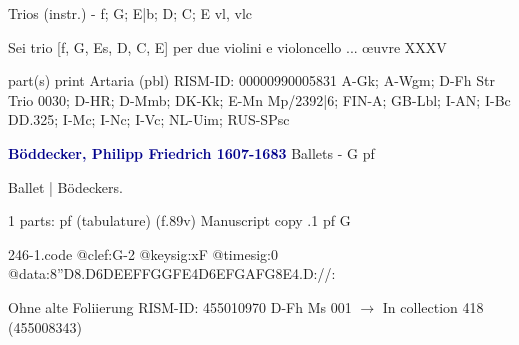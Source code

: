 \documentclass[twocolumn]{book}
\begin{document}
\newline Trios (instr.) - f; G; E|b; D; C; E
 vl, vlc
\newline \begin{itshape}Sei trio [f, G, Es, D, C, E] per due violini e violoncello ... œuvre XXXV\end{itshape} 
\newline \textcolor{darkblue}{}  part(s)
\newline print
\newline Artaria  (pbl)
\newline RISM-ID: 00000990005831
\newline A-Gk; A-Wgm; D-Fh  Str Trio 0030; D-HR; D-Mmb; DK-Kk; E-Mn  Mp/2392|6; FIN-A; GB-Lbl; I-AN; I-Bc  DD.325; I-Mc; I-Nc; I-Vc; NL-Uim; RUS-SPsc
\newline \par \vspace{7pt} \textcolor{darkblue}{\textbf{Böddecker, Philipp Friedrich  1607-1683}}
\newline Ballets - G
\newline pf
\newline \begin{itshape}[f.89v, at left:] Ballet | Bödeckers.\end{itshape} 
\newline \textcolor{darkblue}{}  1 parts: pf (tabulature)  (f.89v)
\newline Manuscript copy
.1  pf  G  
\begin{filecontents*}{246-1.code}
@clef:G-2
@keysig:xF
@timesig:0
@data:8''D{8.D6D}{EEFF}{GGFE}4D{6EFGA}{FG8E}4.D://:
\end{filecontents*}
\newline
%

\newline Ohne alte Foliierung
\newline RISM-ID: 455010970
\newline D-Fh  Ms 001
\newline $\rightarrow$ In collection 418 (455008343)
      
\end{document}
